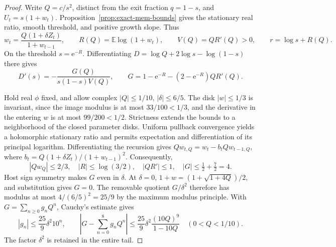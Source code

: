 \begin{proof}
Write \(Q=c/s^2\), distinct from the exit fraction \(q=1-s\), and \(U_t=s(1+w_t)\). Proposition~\ref{prop:exact-mem-bounds} gives the stationary real ratio, smooth threshold, and positive growth slope. Thus
\begin{equation}\label{eq:exact-gap1-scaling}
 w_t=\frac{Q(1+\delta Z_t)}{1+w_{t-1}},\qquad
 R(Q)=\mathbb E\log(1+w_t),\qquad
 V(Q)=QR'(Q)>0,\qquad r=\log s+R(Q).
\end{equation}
On the threshold \(s=\mathrm e^{-R}\). Differentiating \(D=\log Q+2\log s-\log(1-s)\) there gives
\begin{equation}\label{eq:exact-gap1-sign}
 D'(s)=-\frac{G(Q)}{s(1-s)V(Q)},\qquad
 G=1-\mathrm e^{-R}-(2-\mathrm e^{-R})QR'(Q).
\end{equation}

Hold real \(\phi\) fixed, and allow complex \(|Q|\leq1/10\), \(|\delta|\leq6/5\). The disk \(|w|\leq1/3\) is invariant, since the image modulus is at most \(33/100<1/3\), and the derivative in the entering \(w\) is at most \(99/200<1/2\). Strictness extends the bounds to a neighborhood of the closed parameter disks. Uniform pullback convergence yields a holomorphic stationary ratio and permits expectation and differentiation of its principal logarithm. Differentiating the recursion gives
\(Qw_{t,Q}=w_t-b_tQw_{t-1,Q}\), where
\(b_t=Q(1+\delta Z_t)/(1+w_{t-1})^2\).
Consequently,
\begin{equation}\label{eq:exact-gap1-disk}
 |Qw_Q|\leq2/3,\quad |R|\leq\log(3/2),\quad
 |QR'|\leq1,\quad |G|\leq\tfrac12+\tfrac72=4.
\end{equation}
Host sign symmetry makes \(G\) even in \(\delta\). At \(\delta=0\),
\(1+w=(1+\sqrt{1+4Q})/2\), and substitution gives \(G=0\).
The removable quotient \(G/\delta^2\) therefore has modulus at most
\(4/(6/5)^2=25/9\) by the maximum modulus principle. With
\(G=\sum_{n\geq0}g_nQ^n\), Cauchy's estimate gives
\begin{equation}\label{eq:exact-gap1-tail}
 |g_n|\leq\frac{25}{9}\delta^2 10^n,\qquad
 \left|G-\sum_{n=0}^8g_nQ^n\right|
 \leq\frac{25}{9}\delta^2\frac{(10Q)^9}{1-10Q}
 \quad(0<Q<1/10).
\end{equation}
The factor \(\delta^2\) is retained in the entire tail.


\end{proof}
